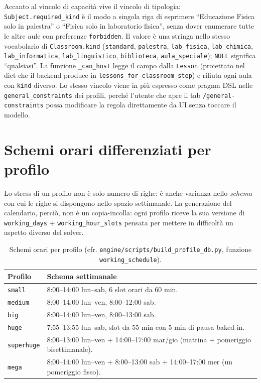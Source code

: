Accanto al vincolo di capacit\`a vive il vincolo di tipologia:
\texttt{Subject.required\_kind} \`e il modo a singola riga di
esprimere ``Educazione Fisica solo in palestra'' o ``Fisica solo
in laboratorio fisica'', senza dover enumerare tutte le altre aule
con preferenze \texttt{forbidden}. Il valore \`e una stringa
nello stesso vocabolario di \texttt{Classroom.kind} (\texttt{standard},
\texttt{palestra}, \texttt{lab\_fisica}, \texttt{lab\_chimica},
\texttt{lab\_informatica}, \texttt{lab\_linguistico},
\texttt{biblioteca}, \texttt{aula\_speciale}); \texttt{NULL}
significa ``qualsiasi''. La funzione \texttt{\_can\_host} legge
il campo dalla \texttt{Lesson} (proiettato nel dict che il
backend produce in \texttt{lessons\_for\_classroom\_step}) e
rifiuta ogni aula con \texttt{kind} diverso. Lo stesso vincolo
viene in pi\`u espresso come pragma DSL nelle
\texttt{general\_constraints} dei profili, perch\'e l'utente che
apre il tab \texttt{/general-constraints} possa modificare la
regola direttamente da UI senza toccare il modello.

\section{Schemi orari differenziati per profilo}

Lo stress di un profilo non \`e solo numero di righe: \`e anche
varianza nello \emph{schema} con cui le righe si dispongono nello
spazio settimanale. La generazione del calendario, perci\`o, non \`e
un copia-incolla: ogni profilo riceve la sua versione di
\texttt{working\_days} + \texttt{working\_hour\_slots} pensata per
mettere in difficolt\`a un aspetto diverso del solver.

\begin{table}[h]
\centering
\caption{Schemi orari per profilo (cfr. \texttt{engine/scripts/build\_profile\_db.py}, funzione \texttt{working\_schedule}).}
\label{tab:profili_orari}
\small
\begin{tabular}{lp{8.5cm}}
\toprule
\textbf{Profilo} & \textbf{Schema settimanale} \\
\midrule
\texttt{small}     & 8:00--14:00 lun--sab, 6 slot orari da 60 min. \\
\texttt{medium}    & 8:00--14:00 lun--ven, 8:00--12:00 sab. \\
\texttt{big}       & 8:00--14:00 lun--ven, 8:00--13:00 sab. \\
\texttt{huge}      & 7:55--13:55 lun--sab, slot da 55 min con
                     5 min di pausa baked-in. \\
\texttt{superhuge} & 8:00--13:00 lun--ven + 14:00--17:00 mar/gio
                     (mattina + pomeriggio bisettimanale). \\
\texttt{mega}      & 8:00--14:00 lun--ven + 8:00--13:00 sab +
                     14:00--17:00 mer (un pomeriggio fisso). \\
\bottomrule
\end{tabular}
\end{table}

